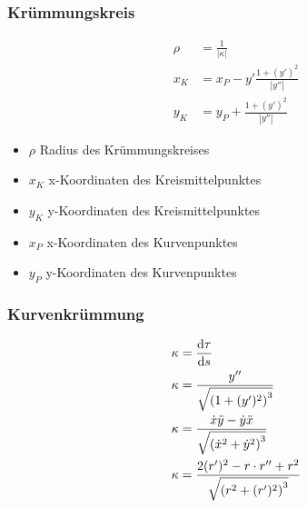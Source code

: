 \newpage
\subsubsection*{Krümmungskreis}
\begin{multicols}{2}
\begin{align*} 
\rho&=\frac{1}{|\kappa|}\\
x_K&=x_P-y'\frac{1+(y')^2}{|y''|}\\
y_K&=y_P+\frac{1+(y')^2}{|y''|}
\end{align*}
\vfill
\begin{itemize}
 \item \(\rho\) Radius des Krümmungskreises
 \item \(x_K\) x-Koordinaten des Kreismittelpunktes
 \item \(y_K\) y-Koordinaten des Kreismittelpunktes
 \item \(x_P\) x-Koordinaten des Kurvenpunktes
 \item \(y_P\) y-Koordinaten des Kurvenpunktes
\end{itemize}
\vfill
\end{multicols}

\subsubsection*{Kurvenkrümmung}
\begin{align*} 
\kappa&=\frac{\mathop{}\!\mathrm{d} \tau}{\mathop{}\!\mathrm{d} s}\\
\kappa&=\frac{y''}{\sqrt{\left(1+(y')^2\right)^3}}\\
\kappa&=\frac{\dot{x}\ddot{y}-\dot{y}\ddot{x}}{\sqrt{\left(\dot{x}^2+\dot{y}^2\right)^3}}\\
\kappa&=\frac{2(r')^2-r\cdot r''+r^2}{\sqrt{\left(r^2+(r')^2\right)^3}}
\end{align*}